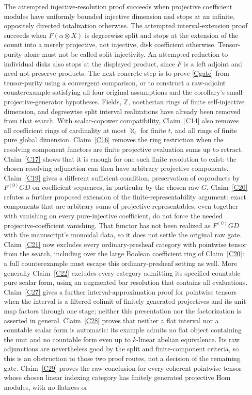 The attempted injective-resolution proof succeeds when projective coefficient modules have uniformly bounded injective dimension and stops at an infinite, oppositely directed totalization otherwise. The attempted interval-extension proof succeeds when $F(\alpha\otimes X)$ is degreewise split and stops at the extension of the counit into a merely projective, not injective, disk coefficient otherwise. Tensor-purity alone must not be called split injectivity. An attempted reduction to individual disks also stops at the displayed product, since $F$ is a left adjoint and need not preserve products. The next concrete step is to prove \eqref{Cgate} from tensor-purity using a convergent comparison, or to construct a raw-adjoint counterexample satisfying all four original assumptions and the corollary's small-projective-generator hypotheses. Fields, $\mathbb Z$, noetherian rings of finite self-injective dimension, and degreewise split interval realizations have already been removed from that search. With scalar-copower compatibility, Claim~\ref{C14} also removes all coefficient rings of cardinality at most $\aleph_t$ for finite $t$, and all rings of finite pure global dimension. Claim~\ref{C16} removes the ring restriction when the resolving component functors are finite projective evaluation sums up to retract. Claim~\ref{C17} shows that it is enough for one such finite resolution to exist: the chosen resolving adjunction can then have arbitrary projective components. Claim~\ref{C19} gives a different sufficient condition, preservation of coproducts by $F^{(0)}GD$ on coefficient sequences, in particular by the chosen raw $G$. Claim~\ref{C20} refutes a further proposed extension of the finite-representability argument: exact components that are arbitrary sums of projective representables, even together with vanishing on every pure-injective coefficient, do not force the needed projective-coefficient vanishing. That functor has not been realized as $F^{(0)}GD$ with the manuscript's monoidal data, so it does not settle the original raw gate. Claim~\ref{C21} now excludes every ordinary-presheaf category with pointwise tensor from the search, including over the large Boolean coefficient ring of Claim~\ref{C20}: a full counterexample must escape this ordinary-presheaf setting as well. More generally Claim~\ref{C22} excludes every category admitting its specified countable pure scalar form, using an augmented bar resolution that contains all evaluations. Claim~\ref{C27} gives a further interval-approximation proof for pointwise tensors when the interval is a filtered colimit of finitely generated projectives and its unit map factors through one stage; neither this presentation nor the factorization is asserted in general. Claim~\ref{C28} proves that neither a flat interval nor a countable scalar form is automatic: its example admits no flat object containing the unit and no countable form even up to $k$-linear abelian equivalence. Its raw adjunctions are nevertheless good by the split and finite-component criteria, so this is an obstruction to those two proof routes, not a decision of the remaining gate. Claim~\ref{C29} proves the raw conclusion for every coherent pointwise tensor whose chosen linear indexing category has finitely generated projective Hom modules, with no flatness or 